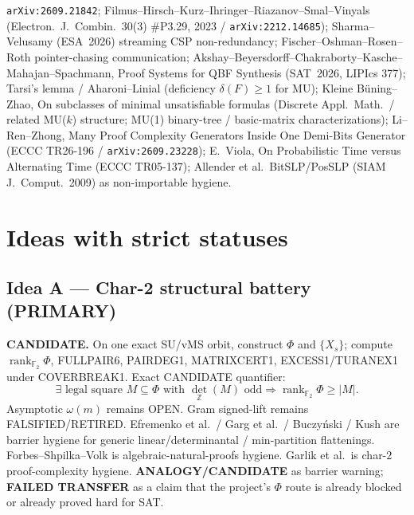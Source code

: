 \documentclass[11pt]{article}
\begin{document}
\texttt{arXiv:2609.21842}; Filmus--Hirsch--Kurz--Ihringer--Riazanov--Smal--Vinyals
(Electron.\ J.\ Combin.\ 30(3) \#P3.29, 2023 / \texttt{arXiv:2212.14685});
Sharma--Velusamy (ESA~2026) streaming CSP non-redundancy;
Fischer--Oshman--Rosen--Roth pointer-chasing communication;
Akshay--Beyersdorff--Chakraborty--Kasche--Mahajan--Spachmann, Proof Systems for
QBF Synthesis (SAT~2026, LIPIcs 377);
Tarsi's lemma / Aharoni--Linial (deficiency $\delta(F)\ge 1$ for MU);
Kleine B\"uning--Zhao, On subclasses of minimal unsatisfiable formulas
(Discrete Appl.\ Math.\ / related MU($k$) structure; MU(1) binary-tree /
basic-matrix characterizations);
Li--Ren--Zhong, Many Proof Complexity Generators Inside One Demi-Bits Generator
(ECCC TR26-196 / \texttt{arXiv:2609.23228});
E.\ Viola, On Probabilistic Time versus Alternating Time (ECCC TR05-137);
Allender et al.\ BitSLP/PosSLP (SIAM J.\ Comput.\ 2009) as non-importable hygiene.

\section*{Ideas with strict statuses}
\subsection*{Idea A --- Char-2 structural battery (PRIMARY)}
\textbf{CANDIDATE.} On one exact SU/vMS orbit, construct $\Phi$ and $\{X_s\}$;
compute $\operatorname{rank}_{\mathbb F_2}\Phi$, FULLPAIR6, PAIRDEG1, MATRIXCERT1,
EXCESS1/TURANEX1 under COVERBREAK1. Exact CANDIDATE quantifier:
\[
\exists\text{ legal square }M\subseteq\Phi\text{ with }\det_{\mathbb Z}(M)\text{ odd}
\Rightarrow\operatorname{rank}_{\mathbb F_2}\Phi\ge|M|.
\]
Asymptotic $\omega(m)$ remains OPEN. Gram signed-lift remains FALSIFIED/RETIRED.
Efremenko et al.\ / Garg et al.\ / Buczy\'nski / Kush are barrier hygiene for
generic linear/determinantal / min-partition flattenings. Forbes--Shpilka--Volk
is algebraic-natural-proofs hygiene. Garlik et al.\ is char-$2$ proof-complexity
hygiene.
\textbf{ANALOGY/CANDIDATE} as barrier warning; \textbf{FAILED TRANSFER} as a claim
that the project's $\Phi$ route is already blocked or already proved hard for SAT.
\end{document}

